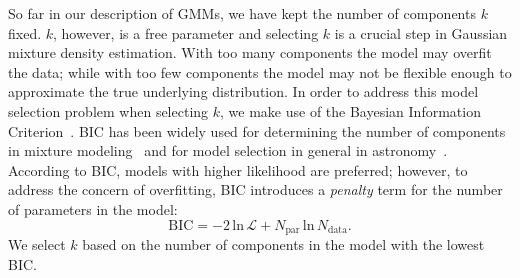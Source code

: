 \documentclass[12pt, letterpaper, preprint]{aastex}
\newcommand{\beq}{\begin{equation}}
\newcommand{\eeq}{\end{equation}}
\newcommand{\gmms}{{\small{GMM}s}\xspace}
\newcommand{\bic}{{\small{BIC}}\xspace}
\begin{document}

So far in our description of \gmms, we have kept
the number of components $k$ fixed. $k$, however, is a free 
parameter and selecting $k$ is a crucial step in Gaussian mixture
density estimation. With too many components the model may overfit 
the data; while with too few components the model may not be flexible
enough to approximate the true 
underlying distribution. In order to address this model selection problem
when selecting $k$, we make use of the Bayesian Information 
Criterion~\citep[\bic;][]{schwarz1978}. \bic has been widely used for 
determining the number of components in mixture 
modeling~\citep[\emph{e.g.}][]{leroux1992,roeder1997,fraley1998,steele2010performance}
and for model selection in general in 
astronomy~\citep[\emph{e.g.}][]{liddle2007,broderick2011,wilkinson2015,vakili2016}.
According to \bic, models with higher likelihood are preferred; however, 
to address the concern of overfitting, \bic introduces a \emph{penalty} term 
for the number of parameters in the model: 
\beq \label{eq:bic}
\mathrm{BIC} = -2\,\mathrm{ln}\,\mathcal{L} + N_\mathrm{par}\,\mathrm{ln}\,N_\mathrm{data}.
\eeq
We select $k$ based on the number of components in the model with the 
lowest \bic. 

\end{document}
